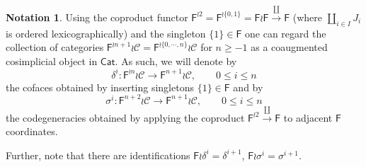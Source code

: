 \documentclass[a4paper,10pt
,draft
]{article}%
\numberwithin{equation}{section}
\numberwithin{figure}{section}
\theoremstyle{definition} %
\newtheorem{notation}[equation]{Notation}%
\newcommand{\Fin}{\mathsf{F}}%
\newcommand{\C}{\ensuremath{\mathcal C}}
\newcommand{\1}{\ensuremath{\mathbbm 1}}%
\begin{document}
 
\begin{notation}
      \label{FIN_COA_COS_NOT}
Using the coproduct functor $\Fin^{\wr 2} = \Fin^{\wr \{{0,1\}}} =\Fin \wr \Fin \xrightarrow{\amalg} \Fin$ (where $\coprod_{i\in I} J_i$ is ordered lexicographically) and the singleton $\{1\} \in \Fin$
one can regard the collection of categories 
$\Fin^{\wr n+1 }\wr \C = \Fin^{\wr \{0,\cdots,n\}} \wr \C $ for $n \geq -1$
 as a coaugmented cosimplicial object in $\mathsf{Cat}$.
As such, we will denote by
\[
	\delta^i\colon \Fin^{\wr n } \wr \C \to \Fin^{n+1} \wr \C, \qquad 0 \leq i \leq n
\]
the cofaces obtained by inserting singletons $\{1\} \in \Fin$ and by 
\[
	\sigma^i \colon \Fin^{n+2} \wr \C \to \Fin^{n+1} \wr \C, \qquad 0 \leq i \leq n
\]
the codegeneracies obtained by applying the coproduct 
$\Fin^{\wr 2} \xrightarrow{\amalg} \Fin$ to adjacent 
$\Fin$ coordinates.

Further, note that there are identifications
$\Fin \wr \delta^{i} = \delta^{i+1}$, 
$\Fin \wr \sigma^{i} = \sigma^{i+1}$.
\end{notation}
 
\end{document}
